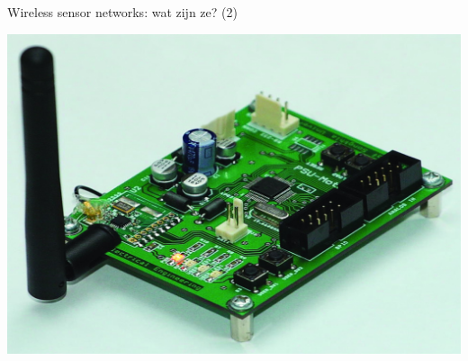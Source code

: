\documentclass[presentation, bigger]{beamer}
\begin{document}
\begin{frame}[label=sec-1-2]{Wireless sensor networks: wat zijn ze? (2)}

\includegraphics[width=\textwidth,keepaspectration=true]{intro/psumote.jpg}

\end{frame}
\end{document}
